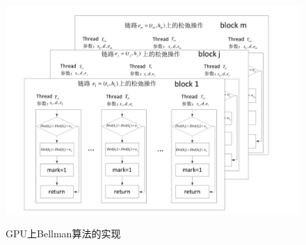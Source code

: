 \begin{figure}
\vspace{-0.4cm}
\setlength{\abovecaptionskip}{-0.5cm}
\begin{center}
{\includegraphics[width=1 \textwidth]{figures/GPUimpl.pdf}}
\end{center}
\caption{{\footnotesize{GPU上Bellman算法的实现}}}
\label{GB}
\end{figure}

